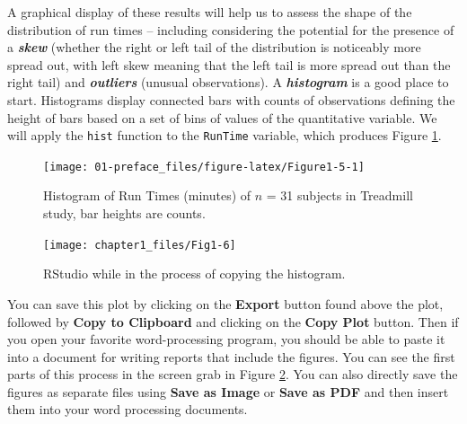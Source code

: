 \documentclass[
]{book}
\newenvironment{Shaded}{\begin{snugshade}}{\end{snugshade}}
\newcommand{\FunctionTok}[1]{\textcolor[rgb]{0.00,0.00,0.00}{#1}}
\newcommand{\NormalTok}[1]{#1}
\newcommand{\SpecialCharTok}[1]{\textcolor[rgb]{0.00,0.00,0.00}{#1}}
\begin{document}
\indent A graphical display of these results will help us to assess the shape
of the distribution of run times -- including considering the potential for the presence of a \textbf{\emph{skew}} (whether the right or left tail of the distribution
is noticeably more spread out, with left skew meaning that the left tail
is more spread out than the right tail)  and \textbf{\emph{outliers}} 
(unusual observations). A \textbf{\emph{histogram}}  is a good place to start.
Histograms display connected bars with counts of observations defining
the height of bars based on a set of bins of values of the quantitative variable.
We will apply the \texttt{hist} function to the \texttt{RunTime} variable, which produces
Figure \ref{fig:Figure1-5}.

\begin{Shaded}
\end{Shaded}



\begin{figure}[ht!]

{\centering \texttt{[image: 01-preface\_files/figure-latex/Figure1-5-1]} 

}

\caption{Histogram of Run Times (minutes) of \(n\) = 31 subjects in Treadmill study, bar heights are counts.}\label{fig:Figure1-5}
\end{figure}



\begin{figure}[ht!]

{\centering \texttt{[image: chapter1\_files/Fig1-6]} 

}

\caption{RStudio while in the process of copying the histogram.}\label{fig:Figure1-6}
\end{figure}

\indent You can save this plot by clicking on the \textbf{Export} button found above
the plot, followed by \textbf{Copy to Clipboard} and clicking on the
\textbf{Copy Plot} button. Then if you open your
favorite word-processing program, you should be able to paste it into a
document for writing reports that include the figures. You can see the first
parts of this process in the screen grab in Figure \ref{fig:Figure1-6}. You can also directly save the figures as separate files using
\textbf{Save as Image} or \textbf{Save as PDF} and then insert them into your word
processing documents.
\end{document}
